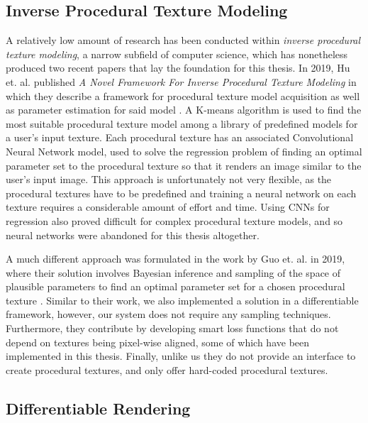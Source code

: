 \subsection{Inverse Procedural Texture Modeling}

A relatively low amount of research has been conducted within \textit{inverse procedural texture modeling}, a narrow subfield of computer science, which has nonetheless produced two recent papers that lay the foundation for this thesis. In 2019, Hu et. al. published \textit{A Novel Framework For Inverse Procedural Texture Modeling} in which they describe a framework for procedural texture model acquisition as well as parameter estimation for said model \cite{hu_2019_a}. A K-means algorithm is used to find the most suitable procedural texture model among a library of predefined models for a user's input texture. Each procedural texture has an associated Convolutional Neural Network model, used to solve the regression problem of finding an optimal parameter set to the procedural texture so that it renders an image similar to the user's input image. This approach is unfortunately not very flexible, as the procedural textures have to be predefined and training a neural network on each texture requires a considerable amount of effort and time. Using CNNs for regression also proved difficult for complex procedural texture models, and so neural networks were abandoned for this thesis altogether. 

A much different approach was formulated in the work by Guo et. al. in 2019, where their solution involves Bayesian inference and sampling of the space of plausible parameters to find an optimal parameter set for a chosen procedural texture \cite{guo_2019_a}. Similar to their work, we also implemented a solution in a differentiable framework, however, our system does not require any sampling techniques. Furthermore, they contribute by developing smart loss functions that do not depend on textures being pixel-wise aligned, some of which have been implemented in this thesis. Finally, unlike us they do not provide an interface to create procedural textures, and only offer hard-coded procedural textures.

\subsection{Differentiable Rendering}

